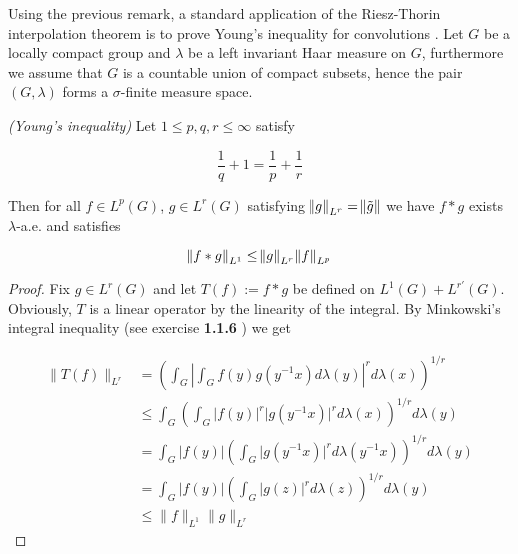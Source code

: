\begin{remark}
	Using the previous remark, a standard application of the Riesz-Thorin interpolation theorem is to prove Young's inequality for convolutions \textup{\cite[22--23]{grafakos:fourier:2014}}. Let $G$ be a locally compact group and $\lambda$ be a left invariant Haar measure on $G$, furthermore we assume that $G$ is a countable union of compact subsets, hence the pair $\left( G,\lambda \right)$ forms a $\sigma$-finite measure space.

\begin{theorem*}\emph{(Young's inequality)}
	Let $1 \leq p,q,r \leq \infty$ satisfy

	\begin{equation}
		\frac{1}{q} + 1 = \frac{1}{p} + \frac{1}{r}
		\label{hyp:young}
	\end{equation}

	Then for all $f \in L^p\left( G \right)$, $g \in L^r\left( G \right)$
	satisfying $\norm{g}_{L^r} = \norm{\tilde{g}}$ we have $f \ast g$ exists $\lambda$-a.e. and satisfies

	\begin{equation*}
		\norm{f \ast g}_{L^1} \leq \norm{g}_{L^r} \norm{f}_{L^p}
	\end{equation*}
\end{theorem*}
	
\begin{proof}
	Fix $g \in L^r\left( G \right)$ and let $T(f) := f \ast g$ be defined on $L^1\left( G \right) + L^{r'}\left( G \right)$. Obviously, $T$ is a linear operator by the linearity of the integral. By Minkowski's integral inequality (see exercise \textbf{1.1.6} \cite[13]{grafakos:fourier:2014}) we get

	\begin{equation*}
		\begin{aligned}
			\|T(f)\|_{L^r} &= \left(\int_G \left\vert \int_G f(y)g(y^{-1}x) d\lambda(y)\right\vert^r d\lambda(x)\right)^{1/r}\\
			&\leq \int_G \left( \int_G \vert f(y) \vert^r \vert g(y^{-1}x) \vert^r d\lambda(x)\right)^{1/r} d\lambda(y)\\
			&= \int_G \vert f(y) \vert \left( \int_G \vert g(y^{-1}x) \vert^r d\lambda(y^{-1}x) \right)^{1/r} d\lambda(y)\\
			&= \int_G \vert f(y) \vert \left( \int_G \vert g(z) \vert^r d\lambda(z) \right)^{1/r} d\lambda(y)\\
			&\leq \|f\|_{L^1} \|g\|_{L^r}
		\end{aligned} 
	\end{equation*}


\end{proof}
\end{remark}
